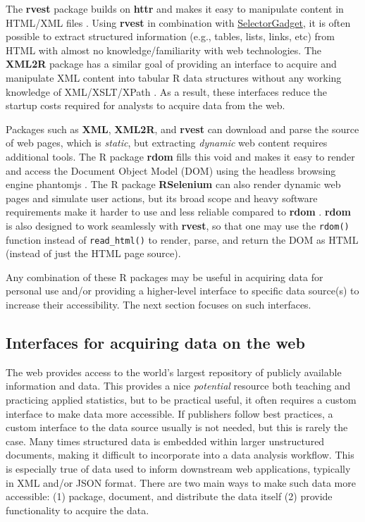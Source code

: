 \documentclass[11pt]{isuthesis}
\begin{document}
The \textbf{rvest} package builds on \textbf{httr} and makes it easy to
manipulate content in HTML/XML files \citep{rvest}. Using \textbf{rvest}
in combination with \href{http://selectorgadget.com/}{SelectorGadget},
it is often possible to extract structured information (e.g., tables,
lists, links, etc) from HTML with almost no knowledge/familiarity with
web technologies. The \textbf{XML2R} package has a similar goal of
providing an interface to acquire and manipulate XML content into
tabular R data structures without any working knowledge of
XML/XSLT/XPath \citep{Sievert:2014a}. As a result, these interfaces
reduce the startup costs required for analysts to acquire data from the
web.

Packages such as \textbf{XML}, \textbf{XML2R}, and \textbf{rvest} can
download and parse the source of web pages, which is \emph{static}, but
extracting \emph{dynamic} web content requires additional tools. The R
package \textbf{rdom} fills this void and makes it easy to render and
access the Document Object Model (DOM) using the headless browsing
engine phantomjs \citep{rdom}. The R package \textbf{RSelenium} can also
render dynamic web pages and simulate user actions, but its broad scope
and heavy software requirements make it harder to use and less reliable
compared to \textbf{rdom} \citep{RSelenium}. \textbf{rdom} is also
designed to work seamlessly with \textbf{rvest}, so that one may use the
\texttt{rdom()} function instead of \texttt{read\_html()} to render,
parse, and return the DOM as HTML (instead of just the HTML page
source).

Any combination of these R packages may be useful in acquiring data for
personal use and/or providing a higher-level interface to specific data
source(s) to increase their accessibility. The next section focuses on
such interfaces.

\subsection{Interfaces for acquiring data on the
web}\label{interfaces-for-acquiring-data-on-the-web}

The web provides access to the world's largest repository of publicly
available information and data. This provides a nice \emph{potential}
resource both teaching and practicing applied statistics, but to be
practical useful, it often requires a custom interface to make data more
accessible. If publishers follow best practices, a custom interface to
the data source usually is not needed, but this is rarely the case. Many
times structured data is embedded within larger unstructured documents,
making it difficult to incorporate into a data analysis workflow. This
is especially true of data used to inform downstream web applications,
typically in XML and/or JSON format. There are two main ways to make
such data more accessible: (1) package, document, and distribute the
data itself (2) provide functionality to acquire the data.
\end{document}
